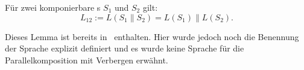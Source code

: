 \begin{lem}
  \label{LemmaSprache}
  Für zwei komponierbare \EIO{}s $S_1$ und $S_2$ gilt: \[L_{12} := L(S_1\|S_2) =
  L(S_1)\|L(S_2).\]
\end{lem}

Dieses Lemma ist bereits in~\cite{Vogler2014EIO} enthalten. Hier wurde jedoch
noch die Benennung der Sprache explizit definiert und es wurde keine Sprache
für die Parallelkomposition mit Verbergen erwähnt.

